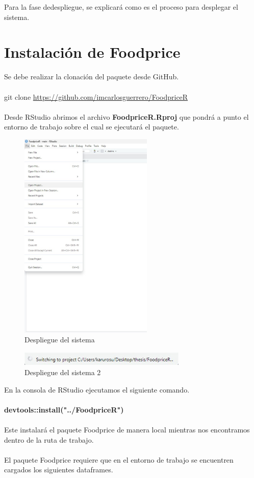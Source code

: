 
Para la fase dedespliegue, se explicar\'a como es el proceso para desplegar el sistema.

\section{Instalaci\'on de Foodprice}

Se debe realizar la clonaci\'on del paquete desde GitHub.
\\
\\
git clone \url{https://github.com/imcarlosguerrero/FoodpriceR}
\\
\\
Desde RStudio abrimos el archivo \textbf{FoodpriceR.Rproj} que pondr\'a a punto el entorno de trabajo sobre el cual se ejecutar\'a el paquete.

\begin{figure}[H]
    \centering
    \includegraphics[height=10cm]{img/despliegue/despliegue4.jpeg}
    \caption{Despliegue del sistema}
    \label{fig:despliegue}
\end{figure}

\begin{figure}[H]
    \centering
    \includegraphics[width=8cm]{img/despliegue/despliegue3.jpeg}
    \caption{Despliegue del sistema 2}
    \label{fig:despliegue2}
\end{figure}


En la consola de RStudio ejecutamos el siguiente comando.
\\
\\
\textbf{devtools::install("../FoodpriceR")}
\\
\\
Este instalar\'a el paquete Foodprice de manera local mientras nos encontramos dentro de la ruta de trabajo.
\\
\\
El paquete Foodprice requiere que en el entorno de trabajo se encuentren cargados los siguientes dataframes.

